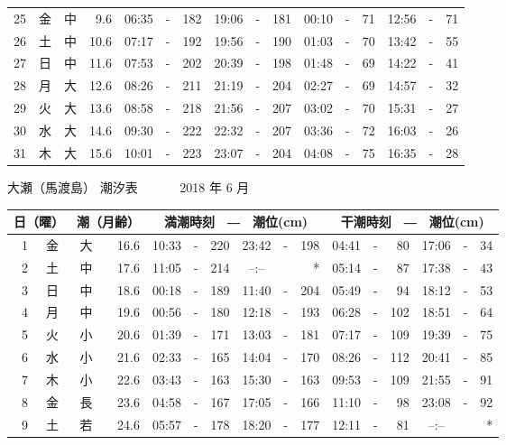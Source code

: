 \documentclass[12pt.a4j]{jsarticle}
\begin{document}
\begin{center}
\begin{table}[ht]
\begin{tabular}{|rc|cr|ccrccr|ccrccr|}
25 & 金 & 中 &  9.6 & 06:35 &-& 182 & 19:06 &-& 181 & 00:10 &-&  71 & 12:56 &-&  71 \\
26 & 土 & 中 & 10.6 & 07:17 &-& 192 & 19:56 &-& 190 & 01:03 &-&  70 & 13:42 &-&  55 \\
27 & 日 & 中 & 11.6 & 07:53 &-& 202 & 20:39 &-& 198 & 01:48 &-&  69 & 14:22 &-&  41 \\
28 & 月 & 大 & 12.6 & 08:26 &-& 211 & 21:19 &-& 204 & 02:27 &-&  69 & 14:57 &-&  32 \\
29 & 火 & 大 & 13.6 & 08:58 &-& 218 & 21:56 &-& 207 & 03:02 &-&  70 & 15:31 &-&  27 \\
30 & 水 & 大 & 14.6 & 09:30 &-& 222 & 22:32 &-& 207 & 03:36 &-&  72 & 16:03 &-&  26 \\
31 & 木 & 大 & 15.6 & 10:01 &-& 223 & 23:07 &-& 204 & 04:08 &-&  75 & 16:35 &-&  28 \\
\hline
\end{tabular}
\end{table}
\newpage
{\LARGE 大瀬（馬渡島）  潮汐表　　　}
{\large 2018 年  6 月}\\
\begin{table}[ht]
\begin{tabular}{|rc|cr|ccrccr|ccrccr|}
\hline
\multicolumn{2}{|c|}{日（曜）} & \multicolumn{2}{c|}{潮（月齢）} & \multicolumn{6}{c|}{満潮時刻　―　潮位(cm)} & \multicolumn{6}{c|}{干潮時刻　―　潮位(cm)} \\
\hline
 1 & 金 & 大 & 16.6 & 10:33 &-& 220 & 23:42 &-& 198 & 04:41 &-&  80 & 17:06 &-&  34 \\
 2 & 土 & 中 & 17.6 & 11:05 &-& 214 & --:-- & &  *  & 05:14 &-&  87 & 17:38 &-&  43 \\
 3 & 日 & 中 & 18.6 & 00:18 &-& 189 & 11:40 &-& 204 & 05:49 &-&  94 & 18:12 &-&  53 \\
 4 & 月 & 中 & 19.6 & 00:56 &-& 180 & 12:18 &-& 193 & 06:28 &-& 102 & 18:51 &-&  64 \\
 5 & 火 & 小 & 20.6 & 01:39 &-& 171 & 13:03 &-& 181 & 07:17 &-& 109 & 19:39 &-&  75 \\
 6 & 水 & 小 & 21.6 & 02:33 &-& 165 & 14:04 &-& 170 & 08:26 &-& 112 & 20:41 &-&  85 \\
 7 & 木 & 小 & 22.6 & 03:43 &-& 163 & 15:30 &-& 163 & 09:53 &-& 109 & 21:55 &-&  91 \\
 8 & 金 & 長 & 23.6 & 04:58 &-& 167 & 17:05 &-& 166 & 11:10 &-&  98 & 23:08 &-&  92 \\
 9 & 土 & 若 & 24.6 & 05:57 &-& 178 & 18:20 &-& 177 & 12:11 &-&  81 & --:-- & &  *  \\

\end{tabular}
\end{table}
\end{center}
\end{document}
